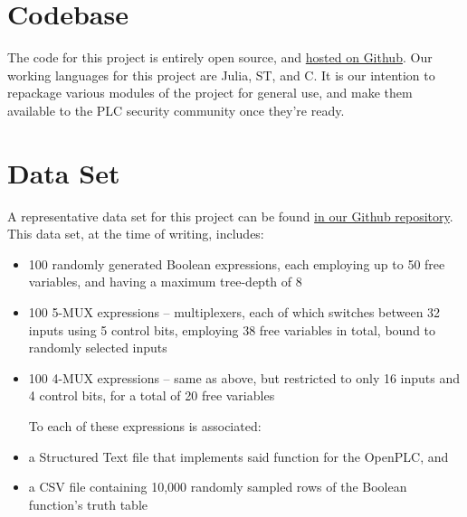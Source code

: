 \documentclass[11pt]{article}
\begin{document}
\section{Codebase}
\label{sec:org54f9a5b}

The code for this project is entirely open source, and \href{https://github.com/oblivia-simplex/refusr}{hosted on Github}. Our working languages for this project are Julia, ST, and C. It is our intention to repackage various modules of the project for general use, and make them available to the PLC security community once they're ready.


\section{Data Set}
\label{sec:orga48fd3c}

A representative data set for this project can be found \href{https://github.com/oblivia-simplex/refusr/blob/main/Refusr/milestone2\_samples.tgz}{in our Github repository}. This data set, at the time of writing, includes:

\begin{itemize}
\item 100 randomly generated Boolean expressions, each employing up to 50 free variables, and having a maximum tree-depth of 8
\item 100 5-MUX expressions -- multiplexers, each of which switches between 32 inputs using 5 control bits, employing 38 free variables in total, bound to randomly selected inputs
\item 100 4-MUX expressions -- same as above, but restricted to only 16 inputs and 4 control bits, for a total of 20 free variables

To each of these expressions is associated:

\item a Structured Text file that implements said function for the OpenPLC, and
\item a CSV file containing 10,000 randomly sampled rows of the Boolean function's truth table
\end{itemize}
\end{document}
